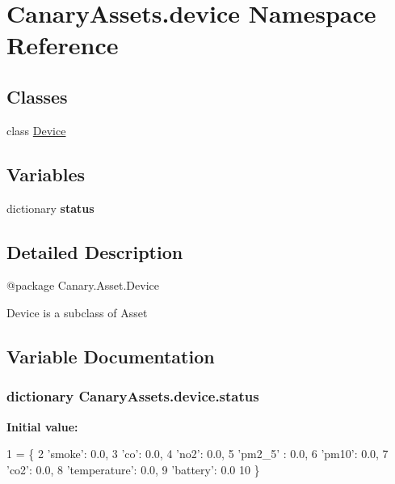 \hypertarget{namespace_canary_assets_1_1device}{\section{Canary\-Assets.\-device Namespace Reference}
\label{namespace_canary_assets_1_1device}
}
\subsection*{Classes}
\begin{DoxyCompactItemize}
\item 
class \hyperlink{class_canary_assets_1_1device_1_1_device}{Device}
\end{DoxyCompactItemize}
\subsection*{Variables}
\begin{DoxyCompactItemize}
\item 
dictionary {\bfseries status}
\end{DoxyCompactItemize}


\subsection{Detailed Description}
\begin{DoxyVerb}@package Canary.Asset.Device

Device is a subclass of Asset
\end{DoxyVerb}
 

\subsection{Variable Documentation}
\hypertarget{namespace_canary_assets_1_1device_ae287d9c51363b0fe6c7e3fc24b502f47}{
\subsubsection[{status}]{\setlength{\rightskip}{0pt plus 5cm}dictionary Canary\-Assets.\-device.\-status}}\label{namespace_canary_assets_1_1device_ae287d9c51363b0fe6c7e3fc24b502f47}
{\bfseries Initial value\-:}
\begin{DoxyCode}
1 = \{
2     \textcolor{stringliteral}{'smoke'}: 0.0,
3     \textcolor{stringliteral}{'co'}: 0.0,
4     \textcolor{stringliteral}{'no2'}: 0.0,
5     \textcolor{stringliteral}{'pm2\_5'} : 0.0,
6     \textcolor{stringliteral}{'pm10'}: 0.0,
7     \textcolor{stringliteral}{'co2'}: 0.0,
8     \textcolor{stringliteral}{'temperature'}: 0.0,
9     \textcolor{stringliteral}{'battery'}: 0.0
10 \}
\end{DoxyCode}
